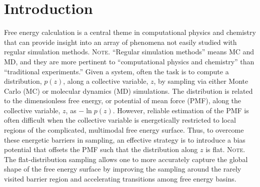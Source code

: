 \documentclass[reprint, superscriptaddress, floatfix]{revtex4-1}
\newcommand{\note}[1]{{\color{DarkGreen}\footnotesize \textsc{Note.} #1}}
\begin{document}
\section{Introduction}



Free energy calculation\cite{frenkel, newman} is a central theme
in computational physics and chemistry
that can provide insight into an array of phenomena not easily studied
with regular simulation methods.
\note{``Regular simulation methods'' means MC and MD,
and they are more pertinent to ``computational physics and chemistry''
than ``traditional experiments.''}%
%
Given a system,
often the task is to compute
a distribution, $p(z)$,
along a collective variable, $z$, by sampling via either
Monte Carlo (MC)\cite{frenkel, newman, landau_binder}
or molecular dynamics (MD)\cite{frenkel, karplus2002}
simulations.
%
The distribution is related to
the dimensionless free energy, or potential of mean force (PMF),
along the collective variable, $z$,
as $-\ln p(z)$.
%
However, reliable estimation of the PMF is often difficult
when the collective variable is energetically restricted to local regions
of the complicated, multimodal free energy surface.
%
Thus,
to overcome these energetic barriers in sampling,
an effective strategy is to introduce
a bias potential\cite{torrie1974, *torrie1977}
that offsets the PMF
such that the distribution along $z$ is
flat.\cite{mezei1987, berg1992, *lee1993,
wang2001, wang2001pre,
huber1994,
*laio2002, *laio2008, *barducci2011, *sutto2012}
%
\note{The flat-distribution sampling
allows one to more accurately capture the
global shape of the free energy surface
by improving the sampling around the rarely visited barrier region
and accelerating transitions among free energy basins.}
\end{document}
